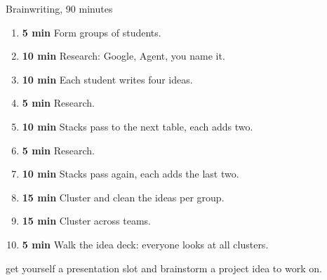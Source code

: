 \begin{frame}{Brainwriting, 90 minutes}
  \begin{sidebody}
    \begin{block}{}
      \setlength{\topsep}{0pt}\setlength{\partopsep}{0pt}%
      \begin{enumerate}\setlength{\itemsep}{0pt}
        \item \textbf{5 min} Form groups of  students.
        \item \textbf{10 min} Research: Google, Agent, you name it.
        \item \textbf{10 min} Each student writes four ideas.
        \item \textbf{5 min} Research.
        \item \textbf{10 min} Stacks pass to the next table, each adds two.
        \item \textbf{5 min} Research.
        \item \textbf{10 min} Stacks pass again, each adds the last two.
        \item \textbf{15 min} Cluster and clean the ideas per group.
        \item \textbf{15 min} Cluster across teams.
        \item \textbf{5 min} Walk the idea deck: everyone looks at all clusters.
      \end{enumerate}
    \end{block}
  \end{sidebody}
\end{frame}


\begin{frame}{}
  \begin{statement}
    get yourself a \alert{presentation slot} and brainstorm a project \alert{idea to work} on.
    \end{statement}
\end{frame}

\chapterreferences
